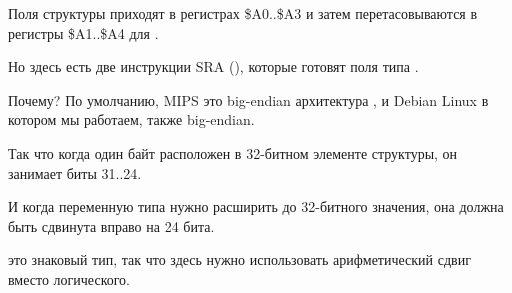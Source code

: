 \label{MIPS_structure_big_endian}



Поля структуры приходят в регистрах \$A0..\$A3 и затем перетасовываются в регистры \$A1..\$A4 для \printf.

Но здесь есть две инструкции SRA (), которые готовят поля типа \Tchar.

Почему?
По умолчанию, MIPS это big-endian архитектура , и Debian Linux в котором мы работаем, также big-endian.

Так что когда один байт расположен в 32-битном элементе структуры, он занимает биты 31..24.

И когда переменную типа \Tchar нужно расширить до 32-битного значения, она должна быть сдвинута вправо
на 24 бита.

\Tchar это знаковый тип, так что здесь нужно использовать арифметический сдвиг вместо логического.


